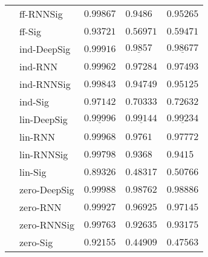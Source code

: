 \begin{tabular}{lllll}
       & ff-RNNSig &                           $ 0.99867 $ &                            $ 0.9486 $ &                           $ 0.95265 $ \\
       & ff-Sig &                           $ 0.93721 $ &                           $ 0.56971 $ &                           $ 0.59471 $ \\
       & ind-DeepSig &                           $ 0.99916 $ &             $  \underline{ 0.9857 } $ &            $  \underline{ 0.98677 } $ \\
       & ind-RNN &                           $ 0.99962 $ &                           $ 0.97284 $ &                           $ 0.97493 $ \\
       & ind-RNNSig &                           $ 0.99843 $ &                           $ 0.94749 $ &                           $ 0.95125 $ \\
       & ind-Sig &                           $ 0.97142 $ &                           $ 0.70333 $ &                           $ 0.72632 $ \\
       & lin-DeepSig &  $  \mathbf{ \underline{ 0.99996 }} $ &  $  \mathbf{ \underline{ 0.99144 }} $ &  $  \mathbf{ \underline{ 0.99234 }} $ \\
       & lin-RNN &                           $ 0.99968 $ &                            $ 0.9761 $ &                           $ 0.97772 $ \\
       & lin-RNNSig &                           $ 0.99798 $ &                            $ 0.9368 $ &                            $ 0.9415 $ \\
       & lin-Sig &                           $ 0.89326 $ &                           $ 0.48317 $ &                           $ 0.50766 $ \\
       & zero-DeepSig &               $  \mathbf{ 0.99988 } $ &               $  \mathbf{ 0.98762 } $ &               $  \mathbf{ 0.98886 } $ \\
       & zero-RNN &                           $ 0.99927 $ &                           $ 0.96925 $ &                           $ 0.97145 $ \\
       & zero-RNNSig &                           $ 0.99763 $ &                           $ 0.92635 $ &                           $ 0.93175 $ \\
       & zero-Sig &                           $ 0.92155 $ &                           $ 0.44909 $ &                           $ 0.47563 $ \\
\bottomrule
\end{tabular}
